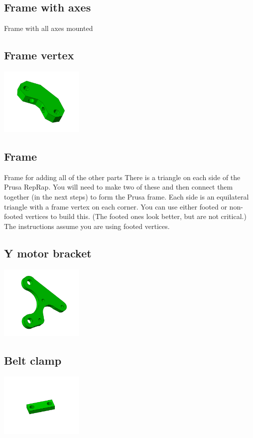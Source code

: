 \documentclass[11pt]{article}
\begin{document}
\hypertarget{thing_frame-with-axes}{\subsection{Frame with axes}}
Frame with all axes mounted

\hypertarget{thing_frame-vertex}{\subsection{Frame vertex}}
\includegraphics[width=4cm]{images/frame-vertex.jpg}

\hypertarget{thing_frame}{\subsection{Frame}}
Frame for adding all of the other parts
There is a triangle on each side of the Prusa RepRap. You will need to make two of these and then connect them together (in the next steps) to form the Prusa frame. Each side is an equilateral triangle with a frame vertex on each corner. You can use either footed or non-footed vertices to build this. (The footed ones look better, but are not critical.) The instructions assume you are using footed vertices.

\hypertarget{thing_y-motor-bracket}{\subsection{Y motor bracket}}
\includegraphics[width=4cm]{images/y-motor-bracket.jpg}

\hypertarget{thing_belt-clamp}{\subsection{Belt clamp}}
\includegraphics[width=4cm]{images/belt-clamp.jpg}
\end{document}
